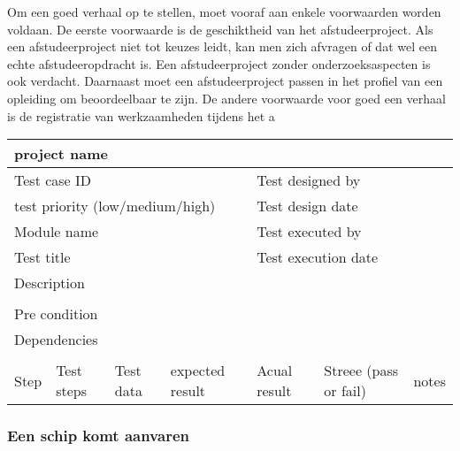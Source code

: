 Om een goed verhaal op te stellen, moet vooraf aan enkele voorwaarden
worden voldaan. De eerste voorwaarde is de geschiktheid van het
afstudeerproject. Als een afstudeerproject niet tot keuzes leidt, kan
men zich afvragen of dat wel een echte afstudeeropdracht is. Een
afstudeerproject zonder onderzoeksaspecten is ook verdacht. Daarnaast
moet een afstudeerproject passen in het profiel van een opleiding om
beoordeelbaar te zijn. De andere voorwaarde voor goed een verhaal is
de registratie van werkzaamheden tijdens het a



\begin{tabular}{|l|l|l|l|l|l|l|} \hline
	\multicolumn{7}{|l|}{project name}                                                               \\ \hline
	\multicolumn{4}{|l|}{Test case ID}   &\multicolumn{3}{|l|}{Test designed by}                           \\ \hline
	\multicolumn{4}{|l|}{test priority (low/medium/high)}   &\multicolumn{3}{|l|}{Test design date}                           \\ \hline
	\multicolumn{4}{|l|}{Module name}   &\multicolumn{3}{|l|}{Test executed by}                           \\ \hline
	\multicolumn{4}{|l|}{Test title}   &\multicolumn{3}{|l|}{Test execution date}                           \\ \hline
	\multicolumn{4}{|l|}{Description}   &\multicolumn{3}{|l|}{ }                           \\ \hline 		
	\multicolumn{7}{|l|}{ }   																\\ \hline
	\multicolumn{7}{|l|}{Pre condition}                                                               \\ \hline
	\multicolumn{7}{|l|}{Dependencies}                                                               \\ \hline
	\multicolumn{7}{|l|}{ }   															\\ \hline
	Step  &  Test steps & Test data & expected result &Acual result &Streee (pass or fail)&notes  \\ \hline
	
\end{tabular}

\subsubsection{Een schip komt aanvaren}	

